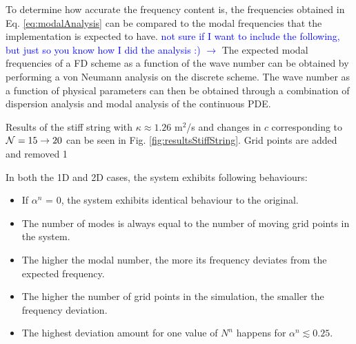 \documentclass[fleqn]{jaes}
\def\SWcomment[#1]{\textcolor{blue}{#1}}
\begin{document}
To determine how accurate the frequency content is, the frequencies obtained in Eq. \eqref{eq:modalAnalysis} can be compared to the modal frequencies that the implementation is expected to have. \SWcomment[not sure if I want to include the following, but just so you know how I did the analysis :) $\rightarrow$]
The expected modal frequencies of a FD scheme as a function of the wave number can be obtained by performing a von Neumann analysis on the discrete scheme. The wave number as a function of physical parameters can then be obtained through a combination of dispersion analysis and modal analysis of the continuous PDE. 

Results of the stiff string with $\kappa \approx 1.26$ m$^2$/s and changes in $c$ corresponding to $\mathcal{N} = 15 \rightarrow 20$ can be seen in Fig. \ref{fig:resultsStiffString}. Grid points are added and removed 1 


In both the 1D and 2D cases, the system exhibits following behaviours:
\begin{itemize}
    \item If $\alpha^n$ = 0, the system exhibits identical behaviour to the original. 
    \item The number of modes is always equal to the number of moving grid points in the system.
    \item The higher the modal number, the more its frequency deviates from the expected frequency.
    \item The higher the number of grid points in the simulation, the smaller the frequency deviation.
    \item The highest deviation amount for one value of $N^n$ happens for $\alpha^n \lesssim 0.25$.
\end{itemize}
\end{document}
